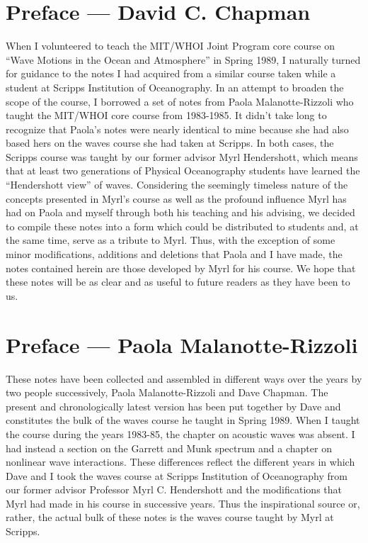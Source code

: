 \chapter*{Preface --- David C. Chapman}
When I volunteered to teach the MIT/WHOI Joint Program core course on
``Wave Motions in the Ocean and Atmosphere'' in Spring 1989, I naturally turned for
guidance to the notes I had acquired from a similar course taken while a student at
Scripps Institution of Oceanography. In an attempt to broaden the scope of the course,
I borrowed a set of notes from Paola Malanotte-Rizzoli who taught the MIT/WHOI
core course from 1983-1985. It didn't take long to recognize that Paola's notes were
nearly identical to mine because she had also based hers on the waves course she had
taken at Scripps. In both cases, the Scripps course was taught by our former advisor
Myrl Hendershott, which means that at least two generations of Physical
Oceanography students have learned the ``Hendershott view'' of waves. Considering
the seemingly timeless nature of the concepts presented in Myrl's course as well as the
profound influence Myrl has had on Paola and myself through both his teaching and
his advising, we decided to compile these notes into a form which could be distributed
to students and, at the same time, serve as a tribute to Myrl. Thus, with the exception
of some minor modifications, additions and deletions that Paola and I have made, the
notes contained herein are those developed by Myrl for his course. We hope that these
notes will be as clear and as useful to future readers as they have been to us.


\chapter*{Preface --- Paola Malanotte-Rizzoli}
These notes have been collected and assembled in different ways over the years
by two people successively, Paola Malanotte-Rizzoli and Dave Chapman. The present
and chronologically latest version has been put together by Dave and constitutes the
bulk of the waves course he taught in Spring 1989. When I taught the course during
the years 1983-85, the chapter on acoustic waves was absent. I had instead a section on
the Garrett and Munk spectrum and a chapter on nonlinear wave interactions. These
differences reflect the different years in which Dave and I took the waves course at
Scripps Institution of Oceanography from our former advisor Professor Myrl C.
Hendershott and the modifications that Myrl had made in his course in successive
years. Thus the inspirational source or, rather, the actual bulk of these notes is the
waves course taught by Myrl at Scripps.

